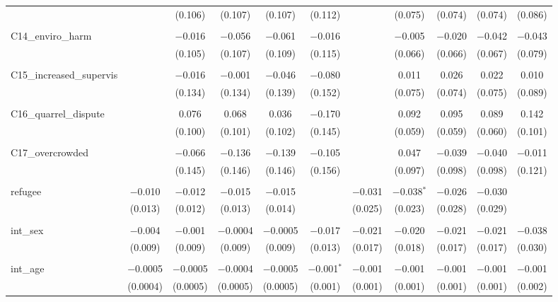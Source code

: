 \begin{table}[H]
\begin{tabular}{@{\extracolsep{4pt}}lcccccccccc}
  &  & (0.106) & (0.107) & (0.107) & (0.112) &  & (0.075) & (0.074) & (0.074) & (0.086) \\ 
  & & & & & & & & & & \\ 
 C14\_enviro\_harm &  & $-$0.016 & $-$0.056 & $-$0.061 & $-$0.016 &  & $-$0.005 & $-$0.020 & $-$0.042 & $-$0.043 \\ 
  &  & (0.105) & (0.107) & (0.109) & (0.115) &  & (0.066) & (0.066) & (0.067) & (0.079) \\ 
  & & & & & & & & & & \\ 
 C15\_increased\_supervis &  & $-$0.016 & $-$0.001 & $-$0.046 & $-$0.080 &  & 0.011 & 0.026 & 0.022 & 0.010 \\ 
  &  & (0.134) & (0.134) & (0.139) & (0.152) &  & (0.075) & (0.074) & (0.075) & (0.089) \\ 
  & & & & & & & & & & \\ 
 C16\_quarrel\_dispute &  & 0.076 & 0.068 & 0.036 & $-$0.170 &  & 0.092 & 0.095 & 0.089 & 0.142 \\ 
  &  & (0.100) & (0.101) & (0.102) & (0.145) &  & (0.059) & (0.059) & (0.060) & (0.101) \\ 
  & & & & & & & & & & \\ 
 C17\_overcrowded &  & $-$0.066 & $-$0.136 & $-$0.139 & $-$0.105 &  & 0.047 & $-$0.039 & $-$0.040 & $-$0.011 \\ 
  &  & (0.145) & (0.146) & (0.146) & (0.156) &  & (0.097) & (0.098) & (0.098) & (0.121) \\ 
  & & & & & & & & & & \\ 
 refugee & $-$0.010 & $-$0.012 & $-$0.015 & $-$0.015 &  & $-$0.031 & $-$0.038$^{*}$ & $-$0.026 & $-$0.030 &  \\ 
  & (0.013) & (0.012) & (0.013) & (0.014) &  & (0.025) & (0.023) & (0.028) & (0.029) &  \\ 
  & & & & & & & & & & \\ 
 int\_sex & $-$0.004 & $-$0.001 & $-$0.0004 & $-$0.0005 & $-$0.017 & $-$0.021 & $-$0.020 & $-$0.021 & $-$0.021 & $-$0.038 \\ 
  & (0.009) & (0.009) & (0.009) & (0.009) & (0.013) & (0.017) & (0.018) & (0.017) & (0.017) & (0.030) \\ 
  & & & & & & & & & & \\ 
 int\_age & $-$0.0005 & $-$0.0005 & $-$0.0004 & $-$0.0005 & $-$0.001$^{*}$ & $-$0.001 & $-$0.001 & $-$0.001 & $-$0.001 & $-$0.001 \\ 
  & (0.0004) & (0.0005) & (0.0005) & (0.0005) & (0.001) & (0.001) & (0.001) & (0.001) & (0.001) & (0.002) \\ 

\end{tabular}
\end{table}
